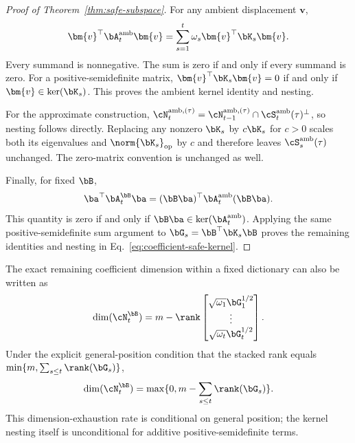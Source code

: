 \begin{proof}[Proof of Theorem~\ref{thm:safe-subspace}]
For any ambient displacement $\bm{v}$,
\begin{equation}
\bm{v}^\top\bA_t^{\mathrm{amb}}\bm{v}
=\sum_{s=1}^{t}\omega_s\bm{v}^\top\bK_s\bm{v}.
\end{equation}
Every summand is nonnegative. The sum is zero if and only if every summand is
zero. For a positive-semidefinite matrix,
$\bm{v}^\top\bK_s\bm{v}=0$ if and only if
$\bm{v}\in\ker(\bK_s)$. This proves the ambient kernel identity and nesting.

For the approximate construction,
$\cN_t^{\mathrm{amb},(\tau)}=
\cN_{t-1}^{\mathrm{amb},(\tau)}\cap
\cS_t^{\mathrm{amb}}(\tau)^\perp$, so nesting follows directly. Replacing any
nonzero $\bK_s$ by $c\bK_s$ for $c>0$ scales both its eigenvalues and
$\norm{\bK_s}_{\mathrm{op}}$ by $c$ and therefore leaves
$\cS_s^{\mathrm{amb}}(\tau)$ unchanged. The zero-matrix convention is unchanged
as well.

Finally, for fixed $\bB$,
\begin{equation}
\ba^\top\bA_t^{\bB}\ba
=(\bB\ba)^\top\bA_t^{\mathrm{amb}}(\bB\ba).
\end{equation}
This quantity is zero if and only if
$\bB\ba\in\ker(\bA_t^{\mathrm{amb}})$. Applying the same positive-semidefinite
sum argument to $\bG_s=\bB^\top\bK_s\bB$ proves the remaining identities and
nesting in Eq.~\eqref{eq:coefficient-safe-kernel}.
\end{proof}

The exact remaining coefficient dimension within a fixed dictionary can also
be written as
\begin{equation}
\operatorname{dim}(\cN_t^{\bB})
=m-\rank\begin{bmatrix}
\sqrt{\omega_1}\bG_1^{1/2}\\
\vdots\\
\sqrt{\omega_t}\bG_t^{1/2}
\end{bmatrix}.
\label{eq:safe-dimension}
\end{equation}
Under the explicit general-position condition that the stacked rank equals
$\min\{m,\sum_{s\leq t}\rank(\bG_s)\}$,
\begin{equation}
\operatorname{dim}(\cN_t^{\bB})
=\max\{0,m-\sum_{s\leq t}\rank(\bG_s)\}.
\end{equation}
This dimension-exhaustion rate is conditional on general position; the kernel
nesting itself is unconditional for additive positive-semidefinite terms.


